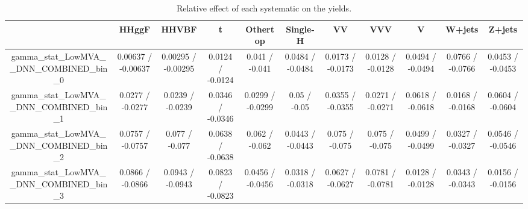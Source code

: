 \documentclass[10pt]{article}
\begin{document}
\begin{table}[htbp]
\begin{center}
\begin{tabular}{|c|c|c|c|c|c|c|c|c|c|c|}
\hline 
      & HHggF      & HHVBF      & t      & Othertop      & Single-H      & VV      & VVV      & V      & W+jets      & Z+jets \\ 
\hline 
  gamma_stat_LowMVA__DNN_COMBINED_bin_0 & 0.00637 / -0.00637 & 0.00295 / -0.00295 & 0.0124 / -0.0124 & 0.041 / -0.041 & 0.0484 / -0.0484 & 0.0173 / -0.0173 & 0.0128 / -0.0128 & 0.0494 / -0.0494 & 0.0766 / -0.0766 & 0.0453 / -0.0453 \\ 
  gamma_stat_LowMVA__DNN_COMBINED_bin_1 & 0.0277 / -0.0277 & 0.0239 / -0.0239 & 0.0346 / -0.0346 & 0.0299 / -0.0299 & 0.05 / -0.05 & 0.0355 / -0.0355 & 0.0271 / -0.0271 & 0.0618 / -0.0618 & 0.0168 / -0.0168 & 0.0604 / -0.0604 \\ 
  gamma_stat_LowMVA__DNN_COMBINED_bin_2 & 0.0757 / -0.0757 & 0.077 / -0.077 & 0.0638 / -0.0638 & 0.062 / -0.062 & 0.0443 / -0.0443 & 0.075 / -0.075 & 0.075 / -0.075 & 0.0499 / -0.0499 & 0.0327 / -0.0327 & 0.0546 / -0.0546 \\ 
  gamma_stat_LowMVA__DNN_COMBINED_bin_3 & 0.0866 / -0.0866 & 0.0943 / -0.0943 & 0.0823 / -0.0823 & 0.0456 / -0.0456 & 0.0318 / -0.0318 & 0.0627 / -0.0627 & 0.0781 / -0.0781 & 0.0128 / -0.0128 & 0.0343 / -0.0343 & 0.0156 / -0.0156 \\ 
\hline 
\end{tabular} 
\caption{Relative effect of each systematic on the yields.} 
\end{center} 
\end{table} 
\end{document}
